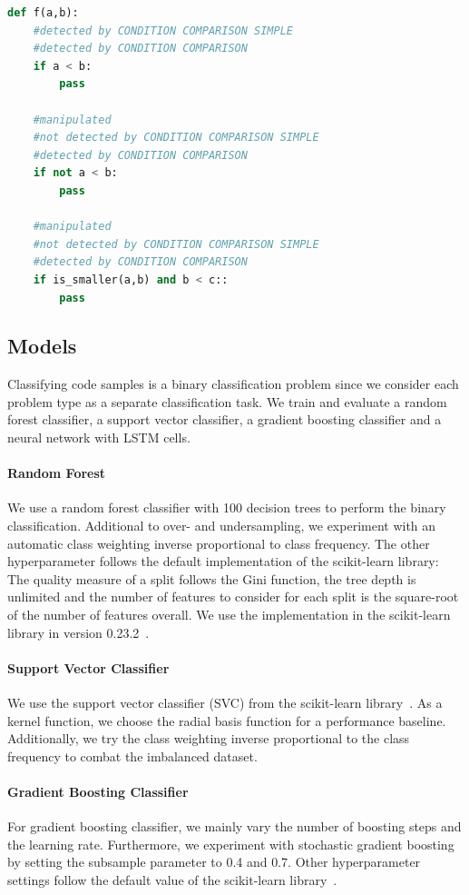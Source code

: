 \begin{lstlisting}[float=t, language=Python, label=lst:conidtion_comparison_modified, caption={Sample statements for the difference between the two analysis plugins CC and CCS.  }]
    def f(a,b):
    #detected by CONDITION COMPARISON SIMPLE
    #detected by CONDITION COMPARISON
    if a < b:
        pass 

    #manipulated
    #not detected by CONDITION COMPARISON SIMPLE
    #detected by CONDITION COMPARISON
    if not a < b:
        pass 

    #manipulated
    #not detected by CONDITION COMPARISON SIMPLE
    #detected by CONDITION COMPARISON
    if is_smaller(a,b) and b < c::
        pass \end{lstlisting}

\subsection{Models}
Classifying code samples is a binary classification problem since we consider each problem type as a separate classification task. We train and evaluate a random forest classifier, a support vector classifier, a gradient boosting classifier and a neural network with LSTM cells.

\paragraph{Random Forest}
We use a random forest classifier with 100 decision trees to perform the binary classification. Additional to over- and undersampling, we experiment with an automatic class weighting inverse proportional to class frequency. The other hyperparameter follows the default implementation of the scikit-learn library: The quality measure of a split follows the Gini function, the tree depth is unlimited and the number of features to consider for each split is the square-root of the number of features overall. We use the implementation in the scikit-learn library in version 0.23.2~\cite{scikit-learn}.
\paragraph{Support Vector Classifier}
We use the support vector classifier (SVC) from the scikit-learn library~\cite{scikit-learn}. As a kernel function, we choose the radial basis function for a performance baseline. Additionally, we try the class weighting inverse proportional to the class frequency to combat the imbalanced dataset.
\paragraph{Gradient Boosting Classifier}
For gradient boosting classifier, we mainly vary the number of boosting steps and the learning rate. Furthermore, we experiment with stochastic gradient boosting by setting the subsample parameter to 0.4 and 0.7. Other hyperparameter settings follow the default value of the scikit-learn library~\cite{scikit-learn}.
